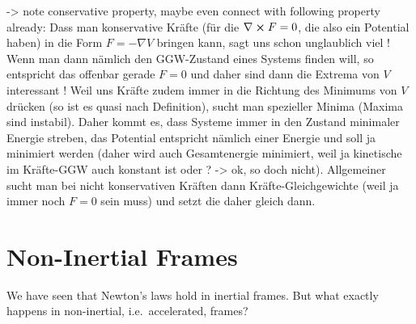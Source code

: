 \documentclass[../class_mech_main.tex]{subfiles}
\begin{document}
-> note conservative property, maybe even connect with following property already: Dass man konservative Kräfte (für die $\nabla \cross F = 0$, die also ein Potential haben) in die Form $F = - \nabla V$ bringen kann, sagt uns schon unglaublich viel ! Wenn man dann nämlich den GGW-Zustand eines Systems finden will, so entspricht das offenbar gerade $F = 0$ und daher sind dann die Extrema von $V$ interessant ! Weil uns Kräfte zudem immer in die Richtung des Minimums von $V$ drücken (so ist es quasi nach Definition), sucht man spezieller Minima (Maxima sind instabil). Daher kommt es, dass Systeme immer in den Zustand minimaler Energie streben, das Potential entspricht nämlich einer Energie und soll ja minimiert werden (daher wird auch Gesamtenergie minimiert, weil ja kinetische im Kräfte-GGW auch konstant ist oder ? -> ok, so doch nicht). Allgemeiner sucht man bei nicht konservativen Kräften dann Kräfte-Gleichgewichte (weil ja immer noch $F = 0$ sein muss) und setzt die daher gleich dann.



\newpage



    \section{Non-Inertial Frames}
We have seen that Newton's laws hold in inertial frames. But what exactly happens in non-inertial, i.e.~accelerated, frames?

\end{document}
